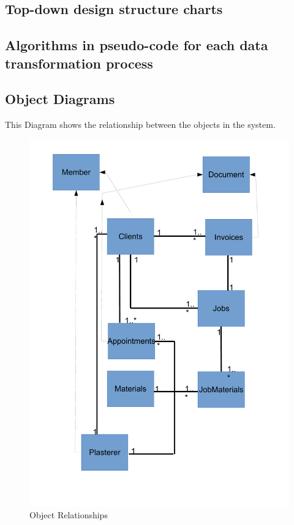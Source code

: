 \subsection{Top-down design structure charts}




\subsection{Algorithms in pseudo-code for each data transformation process}

\pagebreak
\subsection{Object Diagrams}
\begin{flushleft}
This Diagram shows the relationship between the objects in the system.
\end{flushleft}
\begin{figure}[H]
\includegraphics[scale=0.5]{./Design/images/ObjectDiagram.pdf}
    \caption{Object Relationships} 
\label{fig:ObjectDiagram}
\end{figure}



